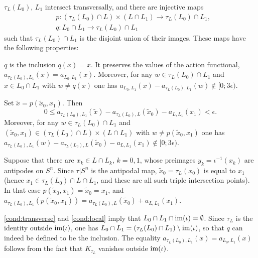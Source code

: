 \documentclass[10pt,letterpaper]{article}
\begin{document}
\begin{lemma} \label{th:new-intersection-points}
$\tau_L(L_0)$, $L_1$ intersect transversally, and there are injective maps
\begin{align*}
 & p: (\tau_L(L_0) \cap L) \times (L \cap L_1)
 \longrightarrow \tau_L(L_0) \cap L_1, \\
 & q: L_0 \cap L_1 \longrightarrow \tau_L(L_0) \cap L_1
\end{align*}
such that $\tau_L(L_0) \cap L_1$ is the disjoint union of their images. These
maps have the following properties:
\begin{romanlist}
\item \label{item:q-map}
$q$ is the inclusion $q(x) = x$. It preserves the values of the action
functional, $a_{\tau_L(L_0),L_1}(x) = a_{L_0,L_1}(x)$. Moreover, for any $w \in
\tau_L(L_0) \cap L_1$ and $x \in L_0 \cap L_1$ with $w \neq q(x)$ one has
$a_{L_0,L_1}(x) - a_{\tau_L(L_0),L_1}(w) \notin [0;3\epsilon)$.

\item \label{item:p-map}
Set $\tilde{x} = p(\tilde{x}_0,x_1)$. Then
\begin{equation} \label{eq:epsilon-change}
 0 \leq a_{\tau_L(L_0),L_1}(\tilde{x}) -
 a_{\tau_L(L_0),L}(\tilde{x}_0) - a_{L,L_1}(x_1)
 < \epsilon.
\end{equation}
Moreover, for any $w \in \tau_L(L_0) \cap L_1$ and $(\tilde{x}_0,x_1) \in
(\tau_L(L_0) \cap L) \times (L \cap L_1)$ with $w \neq p(\tilde{x}_0,x_1)$ one
has $a_{\tau_L(L_0),L_1}(w) - a_{\tau_L(L_0),L}(\tilde{x}_0) - a_{L,L_1}(x_1)
\notin [0;3\epsilon)$.

\item \label{item:p-map-two}
Suppose that there are $x_k \in L \cap L_k$, $k = 0,1$, whose preimages $y_k =
\iota^{-1}(x_k)$ are antipodes on $S^n$. Since $\tau|S^n$ is the antipodal map,
$\tilde{x}_0 = \tau_L(x_0)$ is equal to $x_1$ (hence $x_1 \in \tau_L(L_0) \cap
L \cap L_1$, and these are all such triple intersection points). In that case
$p(\tilde{x}_0,x_1) = \tilde{x}_0 = x_1$, and
$a_{\tau_L(L_0),L_1}(p(\tilde{x}_0,x_1)) = a_{\tau_L(L_0),L}(\tilde{x}_0) +
a_{L,L_1}(x_1)$.
\end{romanlist}
\end{lemma}

\proof \ref{cond:transverse} and \ref{cond:local} imply that $L_0 \cap L_1 \cap
\mathrm{im}(\iota) = \emptyset$. Since $\tau_L$ is the identity outside $\mathrm{im}(\iota)$,
one has $L_0 \cap L_1 = (\tau_L(L_0) \cap L_1) \setminus \mathrm{im}(\iota)$, so that
$q$ can indeed be defined to be the inclusion. The equality
$a_{\tau_L(L_0),L_1}(x) = a_{L_0,L_1}(x)$ follows from the fact that
$K_{\tau_L}$ vanishes outside $\mathrm{im}(\iota)$.
\end{document}
